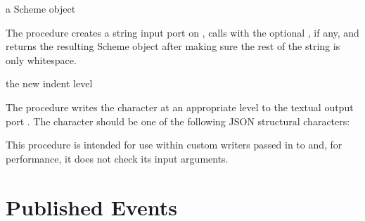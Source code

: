 \begin{procedure}
\end{procedure}
\returns{} a Scheme object

The  procedure creates a string input port
on , calls  with the optional ,
if any, and returns the resulting Scheme object after making sure the rest
of the string is only whitespace.

\begin{procedure}
\end{procedure}
\returns{} the new indent level

The  procedure writes the character
 at an appropriate  level to the textual output
port . The character should be one of the following JSON
structural characters: \code{[ ] \{ \} : ,}

This procedure is intended for use within custom writers passed in to
 and, for performance, it does not check its input arguments.

\section {Published Events}

\begin{event}\end{event}\antipar
\begin{argtbl}
\end{argtbl}
